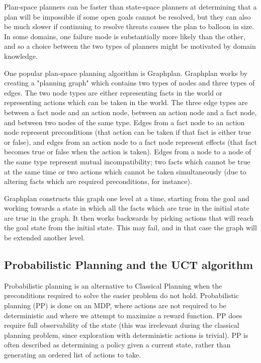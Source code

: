 Plan-space planners can be faster than state-space planners at determining that a plan will be
impossible if some open goals cannot be resolved, but they can also be much slower if
continuing to resolve threats causes the plan to balloon in size.  In some domains, one
failure mode is substantially more likely than the other, and so a choice between the
two types of planners might be motivated by domain knowledge.

One popular plan-space planning algorithm is Graphplan\cite{graphplan}.  Graphplan works by creating
a "planning graph" which contains two types of nodes and three types of edges.  The two node types are
either representing facts in the world or representing actions which can be taken in the world.  The three edge
types are between a fact node and an action node, between an action node and a fact node, and between two
nodes of the same type.  Edges from a fact node to an action node represent preconditions (that action can be
taken if that fact is either true or false), and edges from an action node to a fact node represent effects (that
fact becomes true or false when the action is taken).  Edges from a node to a node of the same type represent
mutual incompatibility; two facts which cannot be true at the same time or two actions which cannot be taken
simultaneously (due to altering facts which are required preconditions, for instance).

Graphplan constructs this graph one level at a time, starting from the goal and working towards a state in which
all the facts which are true in the initial state are true in the graph.  It then works backwards by picking actions
that will reach the goal state from the initial state.  This may fail, and in that case the graph will be extended
another level.



\subsection{Probabilistic Planning and the UCT algorithm}

Probabilistic planning is an alternative to Classical Planning when the preconditions required to solve the
easier problem do not hold.  Probabilistic planning (PP) is done on an MDP, where actions are not required
to be deterministic and where we attempt to maximize a reward function.  PP does require
full observability of the state (this was irrelevant during the classical planning
problem, since exploration with deterministic actions is trivial).  PP is often described
as determining a policy given a current state, rather than generating an ordered list of actions to take.

